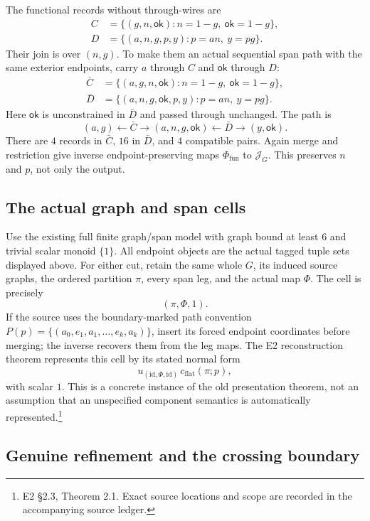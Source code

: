 \documentclass[11pt]{article}
\newcommand{\JG}{\mathcal J_G}
\newcommand{\id}{\mathrm{id}}
\newcommand{\ok}{\mathsf{ok}}
\begin{document}
The functional records without through-wires are
\[
\begin{aligned}
 C&=\{(g,n,\ok):n=1-g,\ \ok=1-g\},\\
 D&=\{(a,n,g,p,y):p=an,\ y=pg\}.
\end{aligned}
\]
Their join is over $(n,g)$. To make them an actual sequential span path with
the same exterior endpoints, carry $a$ through $C$ and $\ok$ through $D$:
\[
\begin{aligned}
 \bar C&=\{(a,g,n,\ok):n=1-g,\ \ok=1-g\},\\
 \bar D&=\{(a,n,g,\ok,p,y):p=an,\ y=pg\}.
\end{aligned}
\]
Here $\ok$ is unconstrained in $\bar D$ and passed through unchanged. The path is
\[
 (a,g)\xleftarrow{}\bar C\xrightarrow{}(a,n,g,\ok)
       \xleftarrow{}\bar D\xrightarrow{}(y,\ok).
\]
There are $4$ records in $\bar C$, $16$ in $\bar D$, and $4$ compatible pairs.
Again merge and restriction give inverse endpoint-preserving maps
$\Phi_{\mathrm{fun}}$ to $\JG$. This preserves $n$ and $p$, not only the output.

\subsection{The actual graph and span cells}

Use the existing full finite graph/span model with graph bound at least $6$
and trivial scalar monoid $\{1\}$. All endpoint objects are the actual tagged
tuple sets displayed above. For either cut, retain the same whole $G$, its
induced source graphs, the ordered partition $\pi$, every span leg, and the
actual map $\Phi$. The cell is precisely
\[
 (\pi,\Phi,1).
\]
If the source uses the boundary-marked path convention
$P(p)=\{(a_0,e_1,a_1,\ldots,e_k,a_k)\}$, insert its forced endpoint coordinates
before merging; the inverse recovers them from the leg maps. The E2
reconstruction theorem represents this cell by its stated normal form
\[
 u_{(\id,\Phi,\id)}\,c_{\mathrm{flat}}(\pi;p),
\]
with scalar $1$. This is a concrete instance of the old presentation theorem,
not an assumption that an unspecified component semantics is automatically
represented.\footnote{E2 \S2.3, Theorem 2.1. Exact source locations and scope
are recorded in the accompanying source ledger.}

\subsection{Genuine refinement and the crossing boundary}
\end{document}
